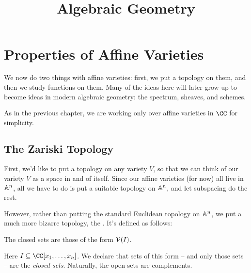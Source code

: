 \documentclass[11pt]{scrreprt}
\begin{document}
\title{Algebraic Geometry}
\maketitle

\chapter{Properties of Affine Varieties}
We now do two things with affine varieties: first, we put a topology on them,
and then we study functions on them.
Many of the ideas here will later grow up to become ideas in modern algebraic geometry:
the spectrum, sheaves, and schemes.

As in the previous chapter, we are working only over affine varieties in $\CC$ for simplicity.

\section{The Zariski Topology}

First, we'd like to put a topology on any variety $V$, so that we can think
of our variety $V$ as a space in and of itself.
Since our affine varieties (for now) all live in $\mathbb A^n$, all we have to do
is put a suitable topology on $\mathbb A^n$, and let subspacing do the rest.

However, rather than putting the standard Euclidean topology on $\mathbb A^n$,
we put a much more bizarre topology, the .
It's defined as follows:
\begin{moral}
	The closed sets are those of the form $\mathcal V(I)$.
\end{moral}
Here $I \subseteq \CC[x_1, \dots, x_n]$.
We declare that sets of this form -- and only those sets -- are the \emph{closed sets}.
Naturally, the open sets are complements.
\end{document}
